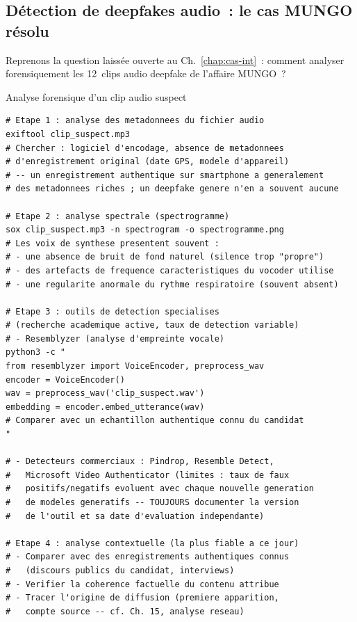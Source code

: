 \subsection{Détection de deepfakes audio~: le cas MUNGO résolu}

Reprenons la question laissée ouverte au Ch.~\ref{chap:cas-int}~:
comment analyser forensiquement les 12~clips audio deepfake de
l'affaire MUNGO~?

\begin{boxoutils}{Analyse forensique d'un clip audio suspect}
\begin{lstlisting}[language=bash_forensique]
# Etape 1 : analyse des metadonnees du fichier audio
exiftool clip_suspect.mp3
# Chercher : logiciel d'encodage, absence de metadonnees
# d'enregistrement original (date GPS, modele d'appareil)
# -- un enregistrement authentique sur smartphone a generalement
# des metadonnees riches ; un deepfake genere n'en a souvent aucune

# Etape 2 : analyse spectrale (spectrogramme)
sox clip_suspect.mp3 -n spectrogram -o spectrogramme.png
# Les voix de synthese presentent souvent :
# - une absence de bruit de fond naturel (silence trop "propre")
# - des artefacts de frequence caracteristiques du vocoder utilise
# - une regularite anormale du rythme respiratoire (souvent absent)

# Etape 3 : outils de detection specialises
# (recherche academique active, taux de detection variable)
# - Resemblyzer (analyse d'empreinte vocale)
python3 -c "
from resemblyzer import VoiceEncoder, preprocess_wav
encoder = VoiceEncoder()
wav = preprocess_wav('clip_suspect.wav')
embedding = encoder.embed_utterance(wav)
# Comparer avec un echantillon authentique connu du candidat
"

# - Detecteurs commerciaux : Pindrop, Resemble Detect,
#   Microsoft Video Authenticator (limites : taux de faux
#   positifs/negatifs evoluent avec chaque nouvelle generation
#   de modeles generatifs -- TOUJOURS documenter la version
#   de l'outil et sa date d'evaluation independante)

# Etape 4 : analyse contextuelle (la plus fiable a ce jour)
# - Comparer avec des enregistrements authentiques connus
#   (discours publics du candidat, interviews)
# - Verifier la coherence factuelle du contenu attribue
# - Tracer l'origine de diffusion (premiere apparition,
#   compte source -- cf. Ch. 15, analyse reseau)
\end{lstlisting}
\end{boxoutils}

